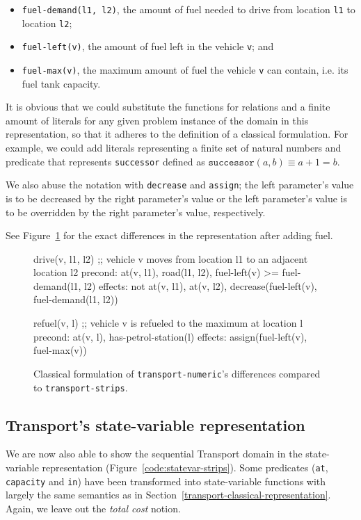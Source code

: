 \begin{itemize}
\item \verb+fuel-demand(l1, l2)+, the amount of fuel needed to drive
from location \verb+l1+ to location \verb+l2+;
\item \verb+fuel-left(v)+, the amount of fuel left in
the vehicle \verb+v+; and
\item \verb+fuel-max(v)+, the maximum amount of fuel
the vehicle \verb+v+ can contain, i.e. its fuel tank capacity.
\end{itemize}

It is obvious that we could substitute the functions for relations
and a finite amount of literals for any given problem instance of
the domain in this representation,
so that it adheres to the definition of a classical formulation.
For example, we could add literals representing a finite set of
natural numbers and predicate that represents
\verb+successor+ defined as $\texttt{successor}(a, b) \equiv a + 1 = b$.

We also abuse the notation with \verb+decrease+ and \verb+assign+;
the left parameter's value is to be decreased by the right
parameter's value or the left parameter's value is to be overridden
by the right parameter's value, respectively.

See Figure~\ref{code:classical-numeric} for the exact differences
in the representation after adding fuel.

\begin{figure}[tb]
\begin{code}
drive(v, l1, l2)
  ;; vehicle v moves from location l1 to an adjacent location l2
  precond: at(v, l1), road(l1, l2), fuel-left(v) >= fuel-demand(l1, l2)
  effects: not at(v, l1), at(v, l2),
           decrease(fuel-left(v),  fuel-demand(l1, l2))
  
refuel(v, l)
  ;; vehicle v is refueled to the maximum at location l
  precond: at(v, l), has-petrol-station(l)
  effects: assign(fuel-left(v), fuel-max(v))
\end{code}
\caption{Classical formulation of \texttt{transport-numeric}'s differences compared to \texttt{transport-strips}.}
\label{code:classical-numeric}
\end{figure}


\subsection{Transport's state-variable representation}

We are now also able to show the sequential Transport domain
in the state-variable representation (Figure~\ref{code:statevar-strips}).
Some predicates (\verb+at+, \verb+capacity+ and \verb+in+) have been transformed
into state-variable functions with largely the same semantics as in
Section~\ref{transport-classical-representation}. Again, we leave out
the \textit{total cost} notion.

